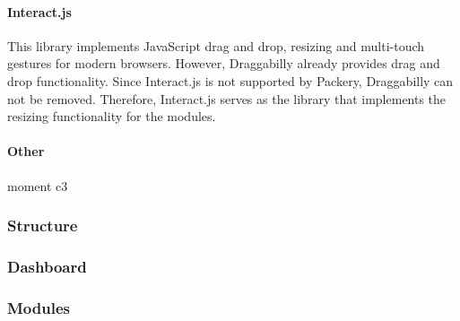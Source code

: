             \paragraph{Interact.js} This library implements JavaScript drag and drop, resizing and multi-touch gestures for modern browsers. However, Draggabilly already provides drag and drop functionality. Since Interact.js is not supported by Packery, Draggabilly can not be removed. Therefore, Interact.js serves as the library that implements the resizing functionality for the modules.

            \paragraph{Other} moment c3

        \subsubsection{Structure}

        \subsubsection{Dashboard}

        \subsubsection{Modules}







